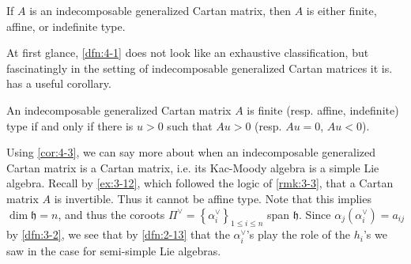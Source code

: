 \documentclass[11pt, letterpaper]{article}
\theoremstyle{plain}
\begin{document}
\begin{proposition}\label{prp:4-2}
	If $A$ is an indecomposable generalized Cartan matrix, then $A$ is either finite, affine, or indefinite type.
\end{proposition}

At first glance, \cref{dfn:4-1} does not look like an exhaustive classification, but fascinatingly in the setting of indecomposable generalized Cartan matrices it is.  has a useful corollary.

\begin{corollary}\label{cor:4-3}
	An indecomposable generalized Cartan matrix $A$ is finite (resp. affine, indefinite) type if and only if there is $u>0$ such that $Au>0$ (resp. $Au=0$, $Au<0$).
\end{corollary}

Using \cref{cor:4-3}, we can say more about when an indecomposable generalized Cartan matrix is a Cartan matrix, i.e. its Kac-Moody algebra is a simple Lie algebra. Recall by \cref{ex:3-12}, which followed the logic of \cref{rmk:3-3}, that a Cartan matrix $A$ is invertible. Thus it cannot be affine type. Note that this implies $\dim \mathfrak{h} =n$, and thus the coroots $\Pi ^\vee =\left\{ \alpha _i^\vee  \right\}_{1\leq i\leq n} $ span $\mathfrak{h} $. Since $\alpha _j(\alpha _i^\vee )=a_{ij} $ by \cref{dfn:3-2}, we see that by \cref{dfn:2-13} that the $\alpha _i^\vee $'s play the role of the $h_i$'s we saw in the case for semi-simple Lie algebras.
\end{document}
